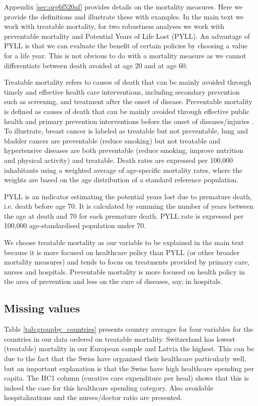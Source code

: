 \documentclass[a4paper,12pt]{article}
\begin{document}
Appendix \ref{sec:org6f520af} provides details on the mortality measures. Here we provide the definitions and illustrate these with examples. In the main text we work with treatable mortality, for two robustness analyses we work with preventable mortality and Potential Years of Life Lost (PYLL). An advantage of PYLL is that we can evaluate the benefit of certain policies by choosing a value for a life year. This is not obvious to do with a mortality measure as we cannot differentiate between death avoided at age 20 and at age 60.

Treatable mortality refers to causes of death that can be mainly avoided through timely and effective health care interventions, including secondary prevention such as screening, and treatment after the onset of disease. Preventable mortality is defined as causes of death that can be mainly avoided through effective public health and primary prevention interventions before the onset of diseases/injuries \citep{countryprofileUK}. To illustrate, breast cancer is labeled as treatable but not preventable, lung and bladder cancer are preventable (reduce smoking) but not treatable and hypertensive diseases are both preventable (reduce smoking, improve nutrition and physical activity) and treatable. Death rates are expressed per 100,000 inhabitants using a weighted average of age-specific mortality rates, where the weights are based on the age distribution of a standard reference population.

PYLL is an indicator estimating the potential years lost due to premature death, i.e. death before age 70. It is calculated by summing the number of years between the age at death and 70 for each premature death. PYLL rate is expressed per 100,000 age-standardised population under 70.

We choose treatable mortality as our variable to be explained in the main text because it is more focused on healthcare policy than PYLL (or other broader mortality measures) and tends to focus on treatments provided by primary care, nurses and hospitals. Preventable mortality is more focused on health policy in the area of prevention and less on the cure of diseases, say, in hospitals.



\subsection{Missing values}
\label{sec:org0e4d9fa}

Table \ref{tab:groupby_countries} presents country averages for four variables for the countries in our data ordered on treatable mortality. Switzerland has lowest (treatable) mortality in our European sample and Latvia the highest. This can be due to the fact that the Swiss have organized their healthcare particularly well, but an important explanation is that the Swiss have high healthcare spending per capita. The HC1 column (curative care expenditure per head) shows that this is indeed the case for this healthcare spending category. Also  avoidable hospitalizations and the nurses/doctor ratio are presented.
\end{document}
